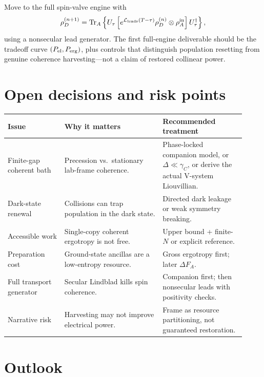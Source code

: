 \documentclass[11pt,a4paper]{article}
\newcommand{\Tr}{\operatorname{Tr}}
\begin{document}
Move to the full spin-valve engine with
\begin{equation}
\rho_D^{(n+1)}=\Tr_A\left\{U_\tau\left[e^{\mathcal L_{\rm leads}(T-\tau)}\rho_D^{(n)}\otimes\rho_A^{\rm in}\right]U_\tau^\dagger\right\},
\end{equation}
using a nonsecular lead generator. The first full-engine deliverable should be the tradeoff curve $(P_{\rm el},P_{\rm erg})$, plus controls that distinguish population resetting from genuine coherence harvesting---not a claim of restored collinear power.

\section{Open decisions and risk points}\label{sec:risks}

\begin{longtable}{p{0.22\linewidth}p{0.38\linewidth}p{0.32\linewidth}}
\toprule
Issue & Why it matters & Recommended treatment \\
\midrule
Finite-gap coherent bath & Precession vs.\ stationary lab-frame coherence. & Phase-locked companion model, or $\Delta\ll\gamma_C$, or derive the actual V-system Liouvillian. \\
Dark-state renewal & Collisions can trap population in the dark state. & Directed dark leakage or weak symmetry breaking. \\
Accessible work & Single-copy coherent ergotropy is not free. & Upper bound + finite-$N$ or explicit reference. \\
Preparation cost & Ground-state ancillas are a low-entropy resource. & Gross ergotropy first; later $\Delta F_A$. \\
Full transport generator & Secular Lindblad kills spin coherence. & Companion first; then nonsecular leads with positivity checks. \\
Narrative risk & Harvesting may not improve electrical power. & Frame as resource partitioning, not guaranteed restoration. \\
\bottomrule
\end{longtable}

\section{Outlook}\label{sec:outlook}
\end{document}
